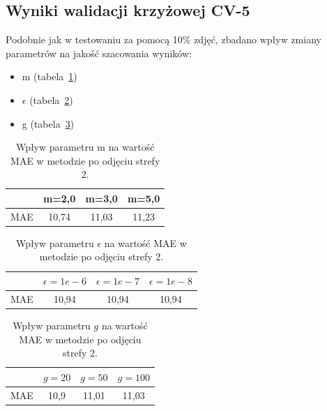 \documentclass[a4paper,twoside,12pt]{book}
\begin{document}
    \subsection*{Wyniki walidacji krzyżowej CV-5}

    Podobnie jak w testowaniu za pomocą 10\% zdjęć, zbadano wpływ zmiany parametrów na jakość szacowania wyników:
    \begin{itemize}
        \item m (tabela~\ref{tab.odjeta_m_cv})
        \item $\epsilon$ (tabela~\ref{tab.odjeta_e_cv})
        \item g (tabela~\ref{tab.odjeta_g_cv})
    \end{itemize}

    \begin{table}[h!]
        \centering
        \caption{Wpływ parametru m na wartość MAE w metodzie po odjęciu strefy 2.}
        \begin{tabular}{|c|c|c|c|}
            \hline
            & m=2,0 & m=3,0 & m=5,0 \\ \hline
            MAE & 10,74 & 11,03 & 11,23 \\ \hline
        \end{tabular}
        \label{tab.odjeta_m_cv}
    \end{table}
    \begin{table}[h!]
        \centering
        \caption{Wpływ parametru $\epsilon$ na wartość MAE w metodzie po odjęciu strefy 2.}
        \begin{tabular}{|c|c|c|c|}
            \hline
            & $\epsilon=1e-6$ & $\epsilon=1e-7$ & $\epsilon=1e-8$ \\ \hline
            MAE & 10,94 & 10,94 & 10,94 \\ \hline
        \end{tabular}
        \label{tab.odjeta_e_cv}
    \end{table}
    \begin{table}[h!]
        \centering
        \caption{Wpływ parametru $g$ na wartość MAE w metodzie po odjęciu strefy 2.}
        \begin{tabular}{|c|c|c|c|}
            \hline
            & $g=20$ & $g=50$ & $g=100$ \\ \hline
            MAE & 10,9 & 11,01 & 11,03 \\ \hline
        \end{tabular}
        \label{tab.odjeta_g_cv}
    \end{table}
\end{document}
